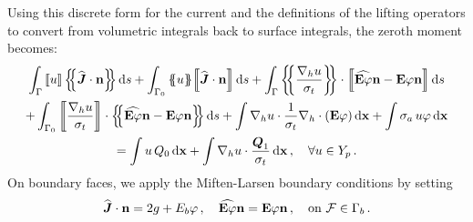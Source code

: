 \documentclass[../doc.tex]{subfiles}
\begin{document}
Using this discrete form for the current and the definitions of the lifting operators to convert from volumetric integrals back to surface integrals, the zeroth moment becomes: 
	\begin{multline} \label{dgvef:familynobc}
		\int_\Gamma \jump{u} \avg{\widehat{\vec{J}}\cdot\n} \ud s + \int_{\Gamma_0} \avg{u}\!\jump{\widehat{\vec{J}}\cdot\n} \ud s + \int_\Gamma \avg{\frac{\nablah u}{\sigma_t}} \cdot \jump{\widehat{\E\varphi}\n - \E\varphi\n} \ud s \\ 
		+ \int_{\Gamma_0} \jump{\frac{\nablah u}{\sigma_t}} \cdot \avg{\widehat{\E\varphi}\n - \E\varphi\n} \ud s + \int \nablah u \cdot \frac{1}{\sigma_t}\nablah\cdot\paren{\E\varphi} \ud \x + \int \sigma_a\, u \varphi \ud \x \\ 
		= \int u\, Q_0 \ud \x + \int \nablah u \cdot \frac{\vec{Q}_1}{\sigma_t} \ud \x \,, \quad \forall u \in Y_p \,. 
	\end{multline}
On boundary faces, we apply the Miften-Larsen boundary conditions by setting 
	\begin{equation} \label{dgvef:ml_bdr_flux}
		\widehat{\boldsymbol{J}}\cdot\boldsymbol{\mathrm{n}} = 2g + E_b \varphi \,, \quad \widehat{\boldsymbol{\mathrm{E}}\varphi}\boldsymbol{\mathrm{n}} = \boldsymbol{\mathrm{E}}\varphi\boldsymbol{\mathrm{n}} \,, \quad \text{on} \ \mathcal{F} \in \Gamma_b \,. 
	\end{equation}
\end{document}
